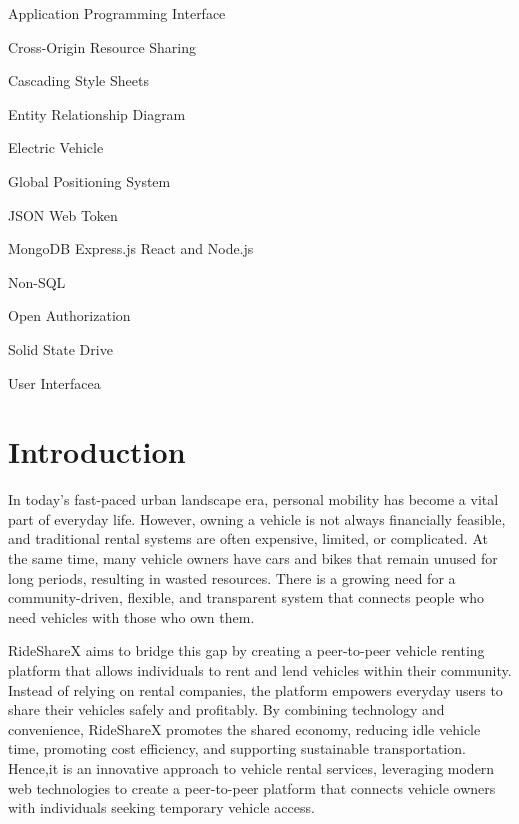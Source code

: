 \documentclass[12pt,a4paper]{report}
\begin{document}
\begin{description}[leftmargin=2cm, style=nextline]
    \item[API] Application Programming Interface
    \item[CORS] Cross-Origin Resource Sharing
    \item[CSS] Cascading Style Sheets
    \item[ERD] Entity Relationship Diagram
    \item[EV] Electric Vehicle
    \item[GPS] Global Positioning System
    \item[JWT] JSON Web Token
    \item[MERN]  MongoDB Express.js React and Node.js
    \item[NoSQL] Non-SQL
    \item[OAuth] Open Authorization
    \item[SSD] Solid State Drive
    \item[UI] User Interfacea
\end{description}
	
	
    \chapter{Introduction}
    \setcounter{page}{1}
	In today’s fast-paced urban landscape era, personal mobility has become a vital part of everyday life. However, owning a vehicle is not always financially feasible, and traditional rental systems are often expensive, limited, or complicated. At the same time, many vehicle owners have cars and bikes that remain unused for long periods, resulting in wasted resources. There is a growing need for a community-driven, flexible, and transparent system that connects people who need vehicles with those who own them.

    RideShareX aims to bridge this gap by creating a peer-to-peer vehicle renting platform that allows individuals to rent and lend vehicles within their community. Instead of relying on rental companies, the platform empowers everyday users to share their vehicles safely and profitably. By combining technology and convenience, RideShareX promotes the shared economy, reducing idle vehicle time, promoting cost efficiency, and supporting sustainable transportation.
    Hence,it is an innovative approach to vehicle rental services, leveraging modern web technologies to create a peer-to-peer platform that connects vehicle owners with individuals seeking temporary vehicle access.
\end{document}
